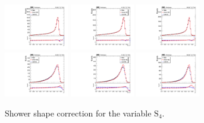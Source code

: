 \begin{figure}[htb]
	\centering
	\includegraphics[width=0.25\textwidth]{fig/ss_corr/s4_16_EB_Z.pdf}
	\includegraphics[width=0.25\textwidth]{fig/ss_corr/ph_s4_17_EB_Z.pdf}
	\includegraphics[width=0.25\textwidth]{fig/ss_corr/s4_18_EB_Z.pdf}\\
	\includegraphics[width=0.25\textwidth]{fig/ss_corr/s4_16_EE_Z.pdf}
	\includegraphics[width=0.25\textwidth]{fig/ss_corr/ph_s4_17_EE_Z.pdf}
	\includegraphics[width=0.25\textwidth]{fig/ss_corr/s4_18_EE_Z.pdf}\\	
	\label{fig:s4_Z}
	\caption{Shower shape correction for the variable $\mathrm{S}_4$.}
\end{figure}

